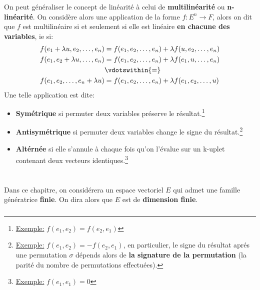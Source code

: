On peut généraliser le concept de linéarité à celui de \textbf{multilinéarité} ou \textbf{n-linéarité}. On considère alors une application de la forme \(f : E^n \longrightarrow F\), alors on dit que \(f\) est multilinéaire si et seulement si elle est linéaire \textbf{en chacune des variables}, ie si:
\begin{align*}
   f(e_1 + \lambda u, e_2, \ldots, e_n) &= f(e_1, e_2, \ldots, e_n) + \lambda f(u, e_2, \ldots, e_n)  \\
   f(e_1, e_2  + \lambda u, \ldots, e_n) &= f(e_1, e_2, \ldots, e_n) + \lambda f(e_1, u, \ldots, e_n) \\
   & \vdotswithin{=} \\   
   f(e_1, e_2 , \ldots, e_n + \lambda u) &= f(e_1, e_2, \ldots, e_n) + \lambda f(e_1, e_2, \ldots, u)
\end{align*}
Une telle application est dite:
\begin{itemize}
   \item \textbf{Symétrique} si permuter deux variables préserve le résultat.\footnote[1]{\underline{Exemple:} \(f(e_1, e_2) = f(e_2, e_1)\)}
   \item \textbf{Antisymétrique} si permuter deux variables change le signe du résultat.\footnote[2]{\underline{Exemple:} \(f(e_1, e_2) = -f(e_2, e_1)\), en particulier, le signe du résultat aprés une permutation \(\sigma\) dépends alors de \textbf{la signature de la permutation} (la parité du nombre de permutations effectuées).}
   \item  \textbf{Altérnée} si elle s'annule à chaque fois qu'on l'évalue sur un k-uplet contenant deux vecteurs identiques.\footnote[3]{\underline{Exemple:} \(f(e_1, e_1) = 0\)}
\end{itemize}
\chapter*{} %

Dans ce chapitre, on considérera un espace vectoriel \(E\) qui admet une famille génératrice \textbf{finie}. On dira alors que \(E\) est de \textbf{dimension finie}.

\subsection*{}

